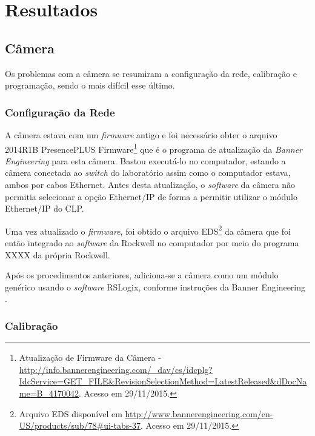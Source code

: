 \chapter{Resultados\label{chap:Resultados}}



\section{Câmera}

Os problemas com a câmera se resumiram a configuração da rede, calibração e programação, sendo o mais difícil esse último.

\subsection{Configuração da Rede}
A câmera estava com um \textit{firmware} antigo e foi necessário obter o arquivo 2014R1B PresencePLUS Firmware\footnote{Atualização de Firmware da Câmera - \url{http://info.bannerengineering.com/_dav/cs/idcplg?IdcService=GET_FILE&RevisionSelectionMethod=LatestReleased&dDocName=B_4170042}. Acesso em 29/11/2015.} que é o programa de atualização da \textit{Banner Engineering} para esta câmera. Bastou executá-lo no computador, estando a câmera conectada ao \textit{switch} do laboratório assim como o computador estava, ambos por cabos Ethernet. Antes desta atualização, o \textit{software} da câmera não permitia selecionar a opção Ethernet/IP de forma a permitir utilizar o módulo Ethernet/IP do CLP.

Uma vez atualizado o \textit{firmware}, foi obtido o arquivo EDS\footnote{Arquivo EDS disponível em \url{http://www.bannerengineering.com/en-US/products/sub/78\#ui-tabs-37}. Acesso em 29/11/2015.} da câmera que foi então integrado ao \textit{software} da Rockwell no computador por meio do programa XXXX da própria Rockwell. %

Após os procedimentos anteriores, adiciona-se a câmera como um módulo genérico usando o \textit{software} RSLogix, conforme instruções da Banner Engineering \cite{presencePlusEthernetIP}.
\subsection{Calibração}

